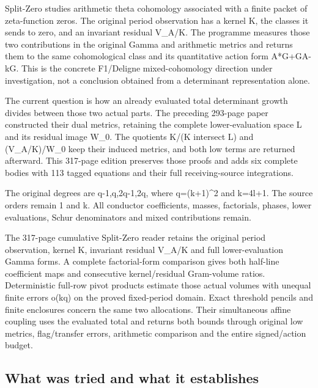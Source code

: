 \documentclass[
]{article}
\begin{document}
Split-Zero studies arithmetic theta cohomology associated with a finite
packet of zeta-function zeros. The original period observation has a
kernel K, the classes it sends to zero, and an invariant residual
V\_A/K. The programme measures those two contributions in the original
Gamma and arithmetic metrics and returns them to the same cohomological
class and its quantitative action form A*G+GA-kG. This is the concrete
F1/Deligne mixed-cohomology direction under investigation, not a
conclusion obtained from a determinant representation alone.

The current question is how an already evaluated total determinant
growth divides between those two actual parts. The preceding 293-page
paper constructed their dual metrics, retaining the complete
lower-evaluation space L and its residual image W\_0. The quotients K/(K
intersect L) and (V\_A/K)/W\_0 keep their induced metrics, and both low
terms are returned afterward. This 317-page edition preserves those
proofs and adds six complete bodies with 113 tagged equations and their
full receiving-source integrations.

The original degrees are q-1,q,2q-1,2q, where q=(k+1)\^{}2 and k=4l+1.
The source orders remain 1 and k. All conductor coefficients, masses,
factorials, phases, lower evaluations, Schur denominators and mixed
contributions remain.

The 317-page cumulative Split-Zero reader retains the original period
observation, kernel K, invariant residual V\_A/K and full
lower-evaluation Gamma forms. A complete factorial-form comparison gives
both half-line coefficient maps and consecutive kernel/residual
Gram-volume ratios. Deterministic full-row pivot products estimate those
actual volumes with unequal finite errors o(kq) on the proved
fixed-period domain. Exact threshold pencils and finite enclosures
concern the same two allocations. Their simultaneous affine coupling
uses the evaluated total and returns both bounds through original low
metrics, flag/transfer errors, arithmetic comparison and the entire
signed/action budget.

\subsection{What was tried and what it
establishes}\label{what-was-tried-and-what-it-establishes}
\end{document}
